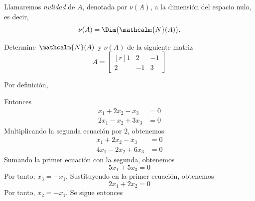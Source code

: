 \begin{definicion}{}{}
    Llamaremos \emph{nulidad} de $A$, denotada por $\nu(A)$, a la dimensión del espacio nulo, es decir,
    $$\nu(A) = \Dim\big(\mathcalm{N}(A)\big).$$
\end{definicion}

\newpage

\begin{examplebox}{}{}
    Determine $\mathcalm{N}(A)$ y $\nu(A)$ de la siguiente matriz
    $$A = \begin{bmatrix*}[r]
        1 & 2 & -1 \\
        2 & -1 & 3
    \end{bmatrix*}$$

    \tcblower
    \solucion Por definición,
    \begin{matrizn}
    \end{matrizn}
    Entonces
    \begin{align*}
        x_1 + 2x_2 - x_3 & = 0\\
        2x_1 - x_2 + 3x_3 & = 0
    \end{align*}
    Multiplicando la segunda ecuación por $2$, obtenemos
    \begin{align*}
        x_1 + 2x_2 - x_3 & = 0\\
        4x_1 - 2x_2 + 6x_3 & = 0
    \end{align*}
    Sumando la primer ecuación con la segunda, obtenemos
    $$5x_1 + 5x_3 = 0$$
    Por tanto, $x_3 = -x_1$. Sustituyendo en la primer ecuación, obtenemos
    $$2x_1 + 2x_2 = 0$$
    Por tanto, $x_2 = -x_1$. Se sigue entonces
    \begin{matrizn}

\end{matrizn}
\end{examplebox}

